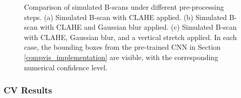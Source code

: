         \begin{figure}[htbp]
          \centering
        
          \hfill
          \hfill
        
          \caption[Comparison of simulated B-scans under different pre-processing steps]{Comparison of simulated B-scans under different pre-processing steps. 
          (a) Simulated B-scan with CLAHE applied. 
          (b) Simulated B-scan with CLAHE and Gaussian blur applied. 
          (c) Simulated B-scan with CLAHE, Gaussian blur, and a vertical stretch applied. 
          In each case, the bounding boxes from the pre-trained CNN in Section \ref{compvis_implementation} are visible, with the corresponding numerical confidence level.}
          \label{fig:sim_bscan_comparison}
        \end{figure}
        
    
    \subsubsection{CV Results}
    
